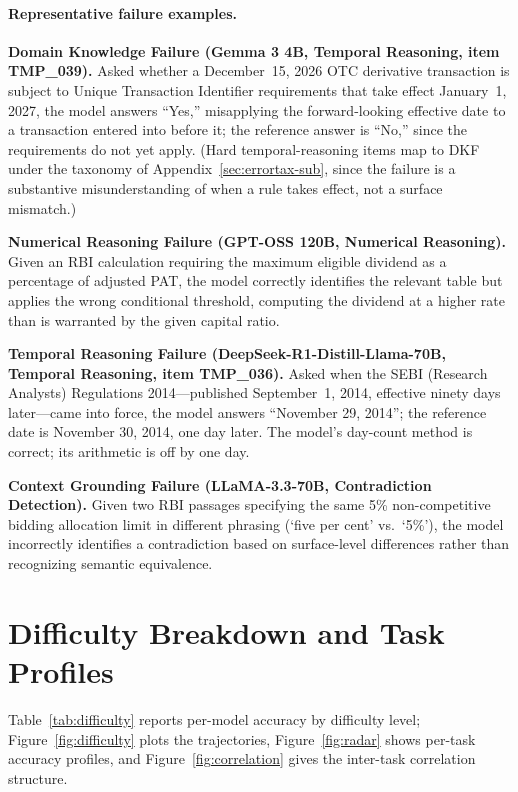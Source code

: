 \paragraph{Representative failure examples.}

\textbf{Domain Knowledge Failure (Gemma 3 4B, Temporal Reasoning, item TMP\_039).} Asked whether a December~15, 2026 OTC derivative transaction is subject to Unique Transaction Identifier requirements that take effect January~1, 2027, the model answers ``Yes,'' misapplying the forward-looking effective date to a transaction entered into before it; the reference answer is ``No,'' since the requirements do not yet apply. (Hard temporal-reasoning items map to DKF under the taxonomy of Appendix~\ref{sec:errortax-sub}, since the failure is a substantive misunderstanding of when a rule takes effect, not a surface mismatch.)

\textbf{Numerical Reasoning Failure (GPT-OSS 120B, Numerical Reasoning).} Given an RBI calculation requiring the maximum eligible dividend as a percentage of adjusted PAT, the model correctly identifies the relevant table but applies the wrong conditional threshold, computing the dividend at a higher rate than is warranted by the given capital ratio.

\textbf{Temporal Reasoning Failure (DeepSeek-R1-Distill-Llama-70B, Temporal Reasoning, item TMP\_036).} Asked when the SEBI (Research Analysts) Regulations 2014---published September~1, 2014, effective ninety days later---came into force, the model answers ``November 29, 2014''; the reference date is November 30, 2014, one day later. The model's day-count method is correct; its arithmetic is off by one day.

\textbf{Context Grounding Failure (LLaMA-3.3-70B, Contradiction Detection).} Given two RBI passages specifying the same 5\% non-competitive bidding allocation limit in different phrasing (`five per cent' vs.\ `5\%'), the model incorrectly identifies a contradiction based on surface-level differences rather than recognizing semantic equivalence.

\section{Difficulty Breakdown and Task Profiles}
\label{app:difficulty}

Table~\ref{tab:difficulty} reports per-model accuracy by difficulty level; Figure~\ref{fig:difficulty} plots the trajectories, Figure~\ref{fig:radar} shows per-task accuracy profiles, and Figure~\ref{fig:correlation} gives the inter-task correlation structure.

